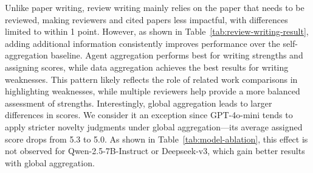  Unlike paper writing, review writing mainly relies on the paper that needs to be reviewed, making reviewers and cited papers less impactful, with differences limited to within 1 point. However, as shown in Table~\ref{tab:review-writing-result}, adding additional information consistently improves performance over the self-aggregation baseline. Agent aggregation performs best for writing strengths and assigning scores, while data aggregation achieves the best results for writing weaknesses. This pattern likely reflects the role of related work comparisons in highlighting weaknesses, while multiple reviewers help provide a more balanced assessment of strengths. Interestingly, global aggregation leads to larger differences in scores. We consider it an exception since GPT-4o-mini tends to apply stricter novelty judgments under global aggregation—its average assigned score drops from 5.3 to 5.0. As shown in Table~\ref{tab:model-ablation}, this effect is not observed for Qwen-2.5-7B-Instruct or Deepseek-v3, which gain better results with global aggregation.



\label{sec:underexplored-idea}
    





